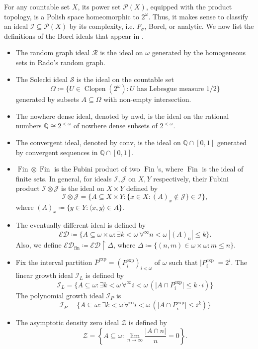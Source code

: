 \documentclass[a4paper,12pt]{amsart}
\theoremstyle{definition}
\numberwithin{thm}{section}
\numberwithin{equation}{section}
\newcommand{\on}{\mathpunct{\upharpoonright}}
\newcommand{\ed}{\mathcal{ED}}
\newcommand{\I}{\mathscr{I}}
\newcommand{\J}{\mathscr{J}}
\DeclareMathOperator{\Fin}{Fin}
\newcommand{\edfin}{\mathcal{ED}_\mathrm{fin}}
\newcommand{\Z}{\mathcal{Z}}
\newcommand{\nwd}{\mathrm{nwd}}
\newcommand{\conv}{\mathrm{conv}}
\renewcommand{\subset}{\subseteq}
\begin{document}
    For any countable set $X$, its power set $\mathcal{P}(X)$, equipped with the product topology, is a Polish space homeomorphic to $2^\omega$. Thus, it makes sense to classify an ideal $\I \subseteq \mathcal{P}(X)$ by its complexity, i.e. $F_\sigma$, Borel, or analytic. We now list the definitions of the Borel ideals that appear in .
    \begin{itemize}
        \item The random graph ideal $\mathcal{R}$ is the ideal on $\omega$ generated by the homogeneous sets in Rado's random graph.
        \item The Solecki ideal $\mathcal{S}$ is the ideal on the countable set
        \[
        \Omega\coloneqq\{U\in\operatorname{Clopen}(2^\omega):U\text{ has Lebesgue measure }1/2\}
        \]
        generated by subsets $A\subseteq\Omega$ with non-empty intersection.
        \item The nowhere dense ideal, denoted by $\nwd$, is the ideal on the rational numbers $\mathbb{Q}\cong2^{<\omega}$ of nowhere dense subsets of $2^{<\omega}$.
        \item The convergent ideal, denoted by $\conv$, is the ideal on $\mathbb{Q}\cap[0, 1]$ generated by convergent sequences in $\mathbb{Q}\cap [0,1]$.
        \item $\Fin\otimes\Fin$ is the Fubini product of two $\Fin$'s, where $\Fin$ is the ideal of finite sets. In general, for ideals $\I,\J$ on $X, Y$ respectively, their Fubini product $\I\otimes\J$ is the ideal on $X\times Y$ defined by
        \[
        \I\otimes\J = \{A\subset X\times Y:\{x\in X:(A)_x\notin\J\}\in\I\},
        \]
        where $(A)_x \coloneqq \{y\in Y:\langle x, y\rangle\in A\}$.
        \item The eventually different ideal is defined by
        \[
        \ed\coloneqq\{A\subseteq\omega\times\omega:\exists k<\omega~\forall^\infty n<\omega~|(A)_n|\leq k\}.
        \]
        Also, we define $\edfin\coloneqq\ed \on \Delta$, where $\Delta\coloneqq\{(n,m)\in\omega\times\omega:m\leq n\}$.
        \item  Fix the interval partition $\bar{P}^\mathrm{exp}=(P_i^\mathrm{exp})_{i<\omega}$ of $\omega$ such that $\lvert P^\mathrm{exp}_i\rvert = 2^i$. 
        The linear growth ideal $\I_L$ is defined by
        \[
        \I_L = \{A\subset\omega: \exists k<\omega\, \forall^\infty i <\omega\, (\lvert A \cap P^\mathrm{exp}_i\rvert \leq k\cdot i)\}
        \]
        The polynomial growth ideal $\I_P$ is
        \[
        \I_P = \{A\subset\omega: \exists k<\omega\, \forall^\infty i <\omega\, (\lvert A \cap P^\mathrm{exp}_i\rvert \leq i^k)\}
        \]
        \item The asymptotic density zero ideal $\Z$ is defined by
        \[
        \Z = \left\{A\subseteq\omega:\lim_{n\to\infty}\frac{\lvert A\cap n\rvert}{n}=0\right\}.
        \]
    \end{itemize}
    
\end{document}
